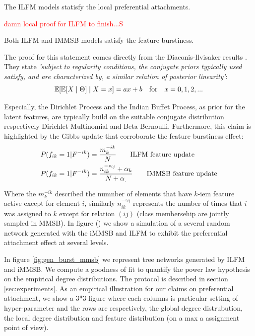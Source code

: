 \begin{proposition}
	The ILFM models statisfy the local preferential attachments.
\end{proposition}
\textcolor{red}{damn local proof for ILFM to finish...S}

\begin{proposition}
	Both ILFM and IMMSB models satisfy the feature burstiness.
\end{proposition}

The proof for this statement comes directly from the Diaconis-Ilvisaker results \cite{diaconis1979conjugate}. They state \emph{'subject to regularity conditions, the conjugate priors typically used satisfy, and are characterized by, a  similar relation of posterior linearity'}:
\begin{equation}
\mathbb{E}[\mathbb{E}[X\mid \Theta] \mid X=x] = ax+b \quad \textnormal{for} \quad x=0,1,2,... \nonumber
\end{equation}

Especially, the Dirichlet Process and the Indian Buffet Process, as prior for the latent features, are typically build on the suitable conjugate distribution respectively Dirichlet-Multinomial and Beta-Bernoulli. Furthermore, this claim is highlighted by the Gibbs update that corroborate the feature burstiness effect:
\begin{align}
&P(f_{ik} = 1 | F^{-ik}) = \frac{m_k^{-ik}}{N} \qquad \textnormal{ILFM feature update} \nonumber \\
&P(f_{ik} = 1 | F^{-ik}) = \frac{n_{ik}^{-z_{ij}}+\alpha_k}{N+\alpha_.} \qquad \textnormal{IMMSB feature update} \nonumber \\
\end{align}

Where the $m_k^{-ik}$ described the numnber of elements that have $k$-iem feature active except for element $i$, similarly $n_{ik}^{-z_{ij}}$ represents the number of times that $i$ was assigned to $k$ except for relation $(ij)$ (class membersehip are jointly sampled in MMSB). In figure () we show a simulation of a several random network generated with the iMMSB and ILFM to exhibit the preferential attachment effect at several levels.

In figure \ref{fig:gen_burst_mmsb} we represent tree networks generated by ILFM and iMMSB. We compute a goodness of fit to quantify the power law hypothesis on the empirical degree distributions. The protocol is described in section \ref{sec:experiments}. As an empirical illustration for our claims on preferential attachment, we show a 3*3 figure where each columns is particular setting of hyper-parameter and the rows are respectively, the global degree distrubution, the local degree distribution and feature distribution (on a max a assignment point of view).

